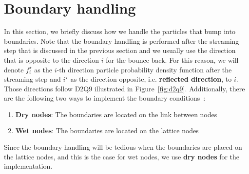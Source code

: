 \section{Boundary handling}\label{boundary-handling-section}
In this section, we briefly discuss how we handle
the particles that bump into boundaries.
Note that the boundary handling is performed
after the streaming step that is discussed in the previous section
and we usually use the direction that is opposite to
the direction $i$ for the bounce-back.
For this reason, we will denote
$f^\star_i$ as the $i$-th direction
particle probability density function
after the streaming step
and $i^\star$ as the direction opposite,
i.e. {\bf reflected direction}, to $i$.
Those directions follow D2Q9 illustrated
in Figure~\ref{fig:d2q9}.
Additionally, there are the following
two ways to
implement the boundary conditions~\cite{liu2014lattice}:
\begin{enumerate}
  \item {\bf Dry nodes}:
  The boundaries are located on the link between nodes
  \item {\bf Wet nodes}:
  The boundaries are located on the lattice nodes
\end{enumerate}
Since the boundary handling will be tedious when
the boundaries are placed on the lattice nodes,
and this is the case for wet nodes,
we use {\bf dry nodes} for the implementation.

